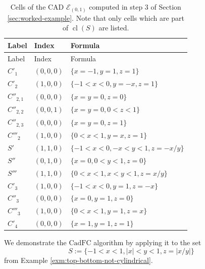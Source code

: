 \documentclass[
]{book}
\theoremstyle{definition}
\theoremstyle{definition}
\theoremstyle{definition}
\theoremstyle{definition}
\theoremstyle{remark}
\begin{document}
\begin{longtable}[]{@{}lll@{}}
\caption{\label{tab:cells-of-e-refined} Cells of the CAD \(\mathcal{E}_{(0,1)}\) computed in step 3 of Section \ref{sec:worked-example}. Note that only cells which are part of \({\operatorname{cl} \left( S \right)}\) are listed.}\tabularnewline
\toprule
Label & Index & Formula\tabularnewline
\midrule
\endfirsthead
\toprule
Label & Index & Formula\tabularnewline
\midrule
\endhead
\({C'_1}\) & \((0,0,0)\) & \(\{ x = -1, y = 1, z = 1 \}\)\tabularnewline
\({C'_2}\) & \((1,0,0)\) & \(\{ -1 < x < 0, y = -x, z = 1 \}\)\tabularnewline
\({C''_{2,1}}\) & \((0,0,0)\) & \(\{ x = y = 0, z = 0 \}\)\tabularnewline
\({C''_{2,2}}\) & \((0,0,1)\) & \(\{ x = y = 0, 0 < z < 1 \}\)\tabularnewline
\({C''_{2,3}}\) & \((0,0,0)\) & \(\{ x = y = 0, z = 1 \}\)\tabularnewline
\({C'''_2}\) & \((1,0,0)\) & \(\{ 0 < x < 1, y = x, z = 1 \}\)\tabularnewline
\(S'\) & \((1,1,0)\) & \(\{ -1 < x < 0, -x < y < 1, z = -x/y \}\)\tabularnewline
\(S''\) & \((0,1,0)\) & \(\{ x = 0, 0 < y < 1, z = 0 \}\)\tabularnewline
\(S'''\) & \((1,1,0)\) & \(\{ 0 < x < 1, x < y < 1, z = x/y \}\)\tabularnewline
\(C'_3\) & \((1,0,0)\) & \(\{ -1 < x < 0, y = 1, z = -x \}\)\tabularnewline
\(C''_3\) & \((0,0,0)\) & \(\{ x = 0, y = 1, z = 0\}\)\tabularnewline
\(C'''_3\) & \((1,0,0)\) & \(\{ 0 < x < 1, y = 1, z = x \}\)\tabularnewline
\({C'_4}\) & \((0,0,0)\) & \(\{ x = 1, y = 1, z = 1 \}\)\tabularnewline
\bottomrule
\end{longtable}

We demonstrate the \(\mathrm{CadFC}\) algorithm by applying it to the set
\[
S := \{ -1 < x < 1, \vert x\vert <y <1, z=\vert x/y\vert \}
\]
from Example \ref{exm:top-bottom-not-cylindrical}.
\end{document}
